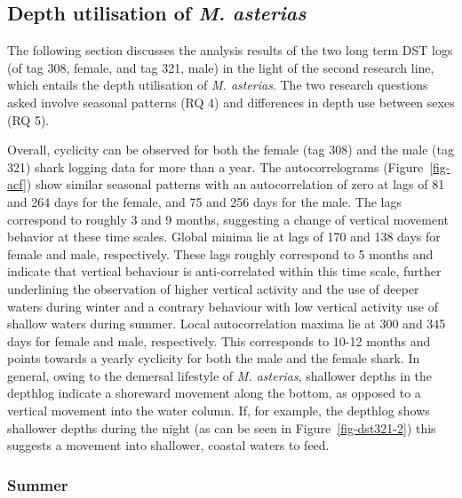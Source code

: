 \documentclass[
  authoryear,
  review,
  3p]{elsarticle}
\begin{document}
\hypertarget{sec-disc-dst-movementpatterns}{%
\subsection{\texorpdfstring{Depth utilisation of \emph{M.
asterias}}{Depth utilisation of M. asterias}}\label{sec-disc-dst-movementpatterns}}

The following section discusses the analysis results of the two long
term DST logs (of tag 308, female, and tag 321, male) in the light of
the second research line, which entails the depth utilisation of
\emph{M. asterias}. The two research questions asked involve seasonal
patterns (RQ 4) and differences in depth use between sexes (RQ 5).

Overall, cyclicity can be observed for both the female (tag 308) and the
male (tag 321) shark logging data for more than a year. The
autocorrelograms (Figure~\ref{fig-acf}) show similar seasonal patterns
with an autocorrelation of zero at lags of 81 and 264 days for the
female, and 75 and 256 days for the male. The lags correspond to roughly
3 and 9 months, suggesting a change of vertical movement behavior at
these time scales. Global minima lie at lags of 170 and 138 days for
female and male, respectively. These lags roughly correspond to 5 months
and indicate that vertical behaviour is anti-correlated within this time
scale, further underlining the observation of higher vertical activity
and the use of deeper waters during winter and a contrary behaviour with
low vertical activity use of shallow waters during summer. Local
autocorrelation maxima lie at 300 and 345 days for female and male,
respectively. This corresponds to 10-12 months and points towards a
yearly cyclicity for both the male and the female shark. In general,
owing to the demersal lifestyle of \emph{M. asterias}, shallower depths
in the depthlog indicate a shoreward movement along the bottom, as
opposed to a vertical movement into the water column. If, for example,
the depthlog shows shallower depths during the night (as can be seen in
Figure~\ref{fig-dst321-2}) this suggests a movement into shallower,
coastal waters to feed.

\hypertarget{summer}{%
\subsubsection{Summer}\label{summer}}
\end{document}
